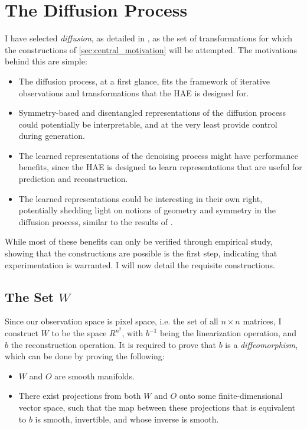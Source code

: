 \documentclass[10pt]{article} %
\begin{document}
\section{The Diffusion Process}
I have selected \textit{diffusion}, as detailed in \cite{sohldickstein2015deep}, as the set of transformations for which the constructions of \ref{sec:central_motivation} will be attempted. The motivations behind this are simple:
\begin{itemize}
\item The diffusion process, at a first glance, fits the framework of iterative observations and transformations that the HAE is designed for.
\item Symmetry-based and disentangled representations of the diffusion process could potentially be interpretable, and at the very least provide control during generation.
\item The learned representations of the denoising process might have performance benefits, since the HAE is designed to learn representations that are useful for prediction and reconstruction.
\item The learned representations could be interesting in their own right, potentially shedding light on notions of geometry and symmetry in the diffusion process, similar to the results of \cite{keurti2023homomorphism}.
\end{itemize}

While most of these benefits can only be verified through empirical study, showing that the constructions are possible is the first step, indicating that experimentation is warranted. I will now detail the requisite constructions.
\subsection{The Set $W$}
Since our observation space is pixel space, i.e. the set of all $n \times n$ matrices, I construct $W$ to be the space $R^{n^2}$, with $b^{-1}$  being the linearization operation, and $b$ the reconstruction operation. It is required to prove that $b$ is a \textit{diffeomorphism}, which can be done by proving the following:
\begin{itemize}
\item $W$ and $O$ are smooth manifolds.
\item There exist projections from both $W$ and $O$ onto some finite-dimensional vector space, such that the map between these projections that is equivalent to $b$ is smooth, invertible, and whose inverse is smooth.
\end{itemize}
\end{document}
